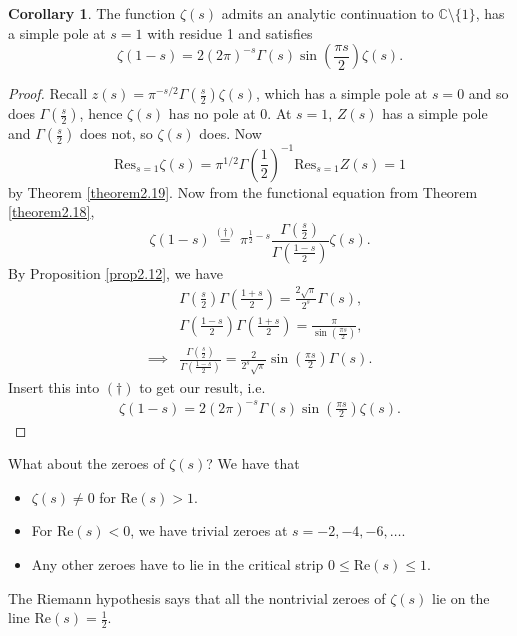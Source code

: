 \documentclass{article}
\theoremstyle{definition}
\newtheorem{cor}[theorem]{Corollary}
\begin{document}
\begin{cor}\label{cor2.20}
    The function $\zeta(s)$ admits an analytic continuation to $\mathbb{C} \setminus \{1\}$, has a simple pole at $s=1$ with residue 1 and satisfies $$\zeta(1-s) = 2 (2\pi)^{-s}\Gamma(s) \sin \left(\frac{\pi s}{2}\right) \zeta(s).$$
\end{cor}
\begin{proof}
    Recall $z(s) = \pi^{-s/2}\Gamma \left(\frac{s}{2}\right)\zeta(s)$, which has a simple pole at $s=0$ and so does $\Gamma \left(\frac{s}{2}\right)$, hence $\zeta(s)$ has no pole at 0. At $s=1$, $Z(s)$ has a simple pole and $\Gamma \left(\frac{s}{2}\right)$ does not, so $\zeta(s)$ does. Now $$\text{Res}_{s=1}\zeta(s) = \pi^{1/2}\Gamma \left(\frac{1}{2}\right)^{-1} \text{Res}_{s=1}Z(s) = 1$$ by Theorem \ref{theorem2.19}. Now from the functional equation from Theorem \ref{theorem2.18}, \[
    \zeta(1-s) \stackrel{(\dagger)}{=} \pi^{\frac{1}{2}-s}\frac{\Gamma \left(\frac{s}{2}\right)}{\Gamma \left(\frac{1-s}{2}\right)} \zeta(s).
    \]
    By Proposition \ref{prop2.12}, we have \begin{align*}
        &\Gamma \left(\frac{s}{2}\right) \Gamma \left(\frac{1+s}{2}\right) = \frac{2\sqrt{\pi}}{2^s}\Gamma(s),\\
        &\Gamma \left(\frac{1-s}{2}\right) \Gamma \left(\frac{1+s}{2}\right) = \frac{\pi}{\sin \left(\frac{\pi s}{2}\right)},\\
        \implies & \frac{\Gamma \left(\frac{s}{2}\right)}{\Gamma \left(\frac{1-s}{2}\right)} = \frac{2}{2^s \sqrt{\pi}}\sin \left(\frac{\pi s}{2}\right) \Gamma(s).
    \end{align*}
    Insert this into $(\dagger)$ to get our result, i.e. 
    \begin{align*}
        \zeta(1-s) = 2 (2\pi)^{-s}\Gamma(s) \sin \left(\frac{\pi s}{2}\right) \zeta(s).
    \end{align*}
\end{proof}
What about the zeroes of $\zeta(s)$? We have that 
\begin{itemize}
    \item $\zeta(s) \neq 0$ for $\text{Re}(s)>1$.
    \item For $\text{Re}(s)<0$, we have trivial zeroes at $s=-2,-4,-6,\ldots$.
    \item Any other zeroes have to lie in the critical strip $0\le \text{Re}(s)\le 1$.
\end{itemize}
The Riemann hypothesis says that all the nontrivial zeroes of $\zeta(s)$ lie on the line $\text{Re}(s) = \frac{1}{2}$.
\end{document}
